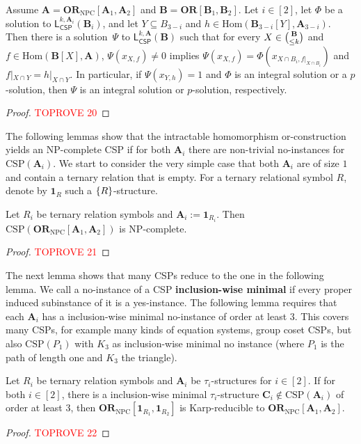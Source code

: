 \documentclass[a4paper,english, thm-restate]{lipics-v2021}
\newcommand{\defining}[1]{\textbf{#1}}
\DeclarePairedDelimiter\set{\lbrace}{\rbrace}
\newcommand{\sig}{\tau}
\newcommand{\StructA}{\mathbf{A}}
\newcommand{\StructB}{\mathbf{B}}
\newcommand{\StructC}{\mathbf{C}}
\newcommand{\CSP}[1]{\mathrm{CSP}(#1)}
\newcommand{\restrict}[2]{#1|_{#2}}
\newcommand{\Hom}[2]{\mathrm{Hom}(#1,#2)}
\newcommand{\leqs}{\mathsf{L}}
\newcommand{\cspiso}[3]{\leqs^{#1,#2}_{\mathsf{CSP}}(#3)}
\newcommand{\ORNPC}[1]{\mathbf{OR}_\text{NPC}[#1]}
\newcommand{\OR}[1]{\mathbf{OR}[#1]}
\newcommand{\onestruc}[1]{\mathbf{1}_{#1}}
\begin{document}
	\begin{lemma}
		\label{lem:hom-or-intractable-solution}
		Assume $\StructA=\ORNPC{\StructA_1,\StructA_2}$
		and $\StructB = \OR{\StructB_1,\StructB_2}$.
		Let  $i \in [2]$, let $\Phi$ be a solution to $\cspiso{k}{\StructA_i}{\StructB_i}$,
		and let $Y \subseteq B_{3-i}$ and $h \in \Hom{\StructB_{3-i}[Y]}{\StructA_{3-i}}$.
		Then there is a solution~$\Psi$ to $\cspiso{k}{\StructA}{\StructB}$
		such that for every $X \in \tbinom{\StructB}{\leq k}$ and $f \in \Hom{\StructB[X]}{\StructA}$,
		$\Psi(x_{X,f})\neq 0$ implies
		$\Psi(x_{X,f}) = \Phi(x_{X\cap B_i, \restrict{f}{X\cap B_i}})$
		and $\restrict{f}{X\cap Y} = \restrict{h}{X\cap Y}$.
		In particular, if $\Psi(x_{Y,h}) = 1$
		and $\Phi$ is an integral solution or a $p$-solution,
		then $\Psi$ is an integral solution or $p$-solution, respectively.
	\end{lemma}
	\begin{proof}\textcolor{red}{TOPROVE 20}\end{proof}
	
	
	The following lemmas show that the intractable homomorphism or-construction yields an NP-complete CSP if for both $\StructA_i$ there are non-trivial
	no-instances for $\CSP{\StructA_i}$.
	We start to consider the very simple case  that both $\StructA_i$ are of size $1$
	and contain a ternary relation that is empty.
	For a ternary relational symbol $R$,
	denote by $\onestruc{R}$ such a $\set{R}$-structure.
	
	\begin{lemma}
		\label{lem:intractable-or-NPC-basic}
		Let $R_i$ be ternary relation symbols and
		$\StructA_i := \onestruc{R_i}$.
		Then $\CSP{\ORNPC{\StructA_1,\StructA_2}}$ is NP-complete.
	\end{lemma}
	\begin{proof}\textcolor{red}{TOPROVE 21}\end{proof}
	
	The next lemma shows that many CSPs reduce to the one in the following lemma.
	We call a no-instance of a CSP \defining{inclusion-wise minimal}
	if every proper induced subinstance of it is a yes-instance.
	The following lemma requires that each $\StructA_i$
	has a inclusion-wise minimal no-instance of order at least $3$.
	This covers many CSPs, for example many kinds of equation systems,
	group coset CSPs, but also $\CSP{P_1}$ with $K_3$ as inclusion-wise minimal no instance (where $P_1$ is the path of length one and $K_3$ the triangle).
	
	\begin{lemma}
		\label{lem:intractable-or-NPC-reduce}
		Let $R_i$ be ternary relation symbols
		and $\StructA_i$ be $\sig_i$-structures for $i\in[2]$.
		If for both $i \in [2]$,
		there is a inclusion-wise minimal $\sig_i$-structure $\StructC_i \notin \CSP{\StructA_i}$
		of order at  least $3$,
		then $\ORNPC{\onestruc{R_1}, \onestruc{R_2}}$ is Karp-reducible to $\ORNPC{\StructA_1,\StructA_2}$.
	\end{lemma}
	\begin{proof}\textcolor{red}{TOPROVE 22}\end{proof}
	
\end{document}
